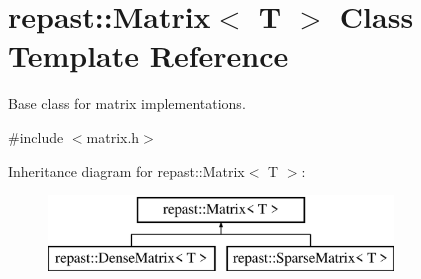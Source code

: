 \hypertarget{classrepast_1_1_matrix}{\section{repast\-:\-:Matrix$<$ T $>$ Class Template Reference}
\label{classrepast_1_1_matrix}
}


Base class for matrix implementations.  




{\ttfamily \#include $<$matrix.\-h$>$}

Inheritance diagram for repast\-:\-:Matrix$<$ T $>$\-:\begin{figure}[H]
\begin{center}
\leavevmode
\includegraphics[height=2.000000cm]{classrepast_1_1_matrix}
\end{center}
\end{figure}
